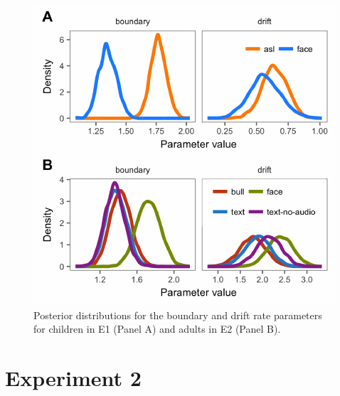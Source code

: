 \documentclass[10pt, letterpaper]{article}
\newenvironment{CodeChunk}{}{}
\begin{document}
\begin{CodeChunk}
\begin{figure}[t]

{\centering \includegraphics{figs/hddm_plot-1} 

}

\caption[Posterior distributions for the boundary and drift rate parameters for children in E1 (Panel A) and adults in E2 (Panel B)]{Posterior distributions for the boundary and drift rate parameters for children in E1 (Panel A) and adults in E2 (Panel B).}\label{fig:hddm_plot}
\end{figure}
\end{CodeChunk}

\section{Experiment 2}\label{experiment-2}
\end{document}
